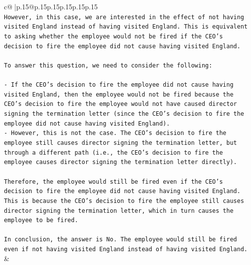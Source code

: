 \documentclass{article}
\begin{document}
{\begin{supertabular}{c@{$\;$}|p{.15\linewidth}@{}p{.15\linewidth}p{.15\linewidth}p{.15\linewidth}p{.15\linewidth}p{.15\linewidth}}
{{{\\ 
\texttt{However, in this case, we are interested in the effect of not having visited England instead of having visited England. This is equivalent to asking whether the employee would not be fired if the CEO's decision to fire the employee did not cause having visited England.} \\
\\ 
\texttt{To answer this question, we need to consider the following:} \\
\\ 
\texttt{{-} If the CEO's decision to fire the employee did not cause having visited England, then the employee would not be fired because the CEO's decision to fire the employee would not have caused director signing the termination letter (since the CEO's decision to fire the employee did not cause having visited England).} \\
\texttt{{-} However, this is not the case. The CEO's decision to fire the employee still causes director signing the termination letter, but through a different path (i.e., the CEO's decision to fire the employee causes director signing the termination letter directly).} \\
\\ 
\texttt{Therefore, the employee would still be fired even if the CEO's decision to fire the employee did not cause having visited England. This is because the CEO's decision to fire the employee still causes director signing the termination letter, which in turn causes the employee to be fired.} \\
\\ 
\texttt{In conclusion, the answer is No. The employee would still be fired even if not having visited England instead of having visited England.} \\
            }
        }
    }
    & \\ \\


\end{supertabular}}
\end{document}
